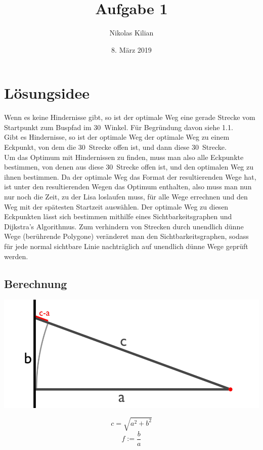 \documentclass[12pt]{article}
\title{\vspace{-2.0cm}Aufgabe 1}
\author{Nikolas Kilian}
\date{8. März 2019}
\begin{document}
\maketitle

\section{Lösungsidee}
Wenn es keine Hindernisse gibt, so ist der optimale Weg eine gerade Strecke vom Startpunkt zum Buspfad im 30\degree\ Winkel. Für Begründung davon siehe 1.1.\\
Gibt es Hindernisse, so ist der optimale Weg der optimale Weg zu einem Eckpunkt, von dem die 30\degree\ Strecke offen ist, und dann diese 30\degree\ Strecke.\\
Um das Optimum mit Hindernissen zu finden, muss man also alle Eckpunkte bestimmen, von denen aus diese 30\degree\ Strecke offen ist, und den optimalen Weg zu ihnen bestimmen. Da der optimale Weg das Format der resultierenden Wege hat, ist unter den resultierenden Wegen das Optimum enthalten, also muss man nun nur noch die Zeit, zu der Lisa loslaufen muss, für alle Wege errechnen und den Weg mit der spätesten Startzeit auswählen.
Der optimale Weg zu diesen Eckpunkten lässt sich bestimmen mithilfe eines Sichtbarkeitsgraphen und Dijkstra's Algorithmus. Zum verhindern von Strecken durch unendlich dünne Wege (berührende Polygone) veränderet man den Sichtbarkeitsgraphen, sodass für jede normal sichtbare Linie nachträglich auf unendlich dünne Wege geprüft werden.

\subsection{Berechnung}
\newcommand{\vb}{v_{Bus}}
\newcommand{\vl}{v_{Lisa}}

\newcommand{\x}{x}

\renewcommand{\a}{a}
\renewcommand{\b}{b}
\renewcommand{\c}{c}

\newcommand{\f}{f}

\newcommand{\tf}{t(\f)}
\newcommand{\df}[1]{\frac{d#1}{d\f}}
\newcommand{\dtf}{\df{\tf}}

\begin{minipage}{0.8\textwidth}
\includegraphics[scale=0.4]{CalcLabel}
\end{minipage}
\begin{minipage}{0.15\textwidth}
\vspace{-1cm}
\[\c=\sqrt{\a^2+\b^2}\]
\[\f:=\frac{\b}{\a}\]%
\end{minipage}
\end{document}
